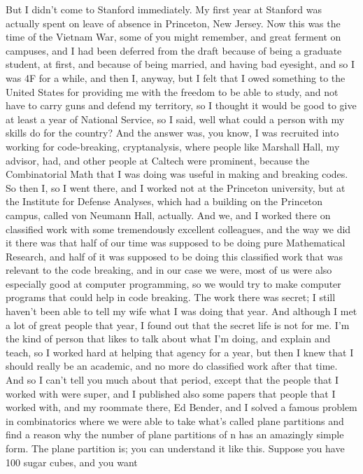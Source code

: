 \documentclass[]{article}
\begin{document}
But I didn't come to Stanford immediately. My first year at Stanford was
actually spent on leave of absence in Princeton, New Jersey. Now this
was the time of the Vietnam War, some of you might remember, and great
ferment on campuses, and I had been deferred from the draft because of
being a graduate student, at first, and because of being married, and
having bad eyesight, and so I was 4F for a while, and then I, anyway,
but I felt that I owed something to the United States for providing me
with the freedom to be able to study, and not have to carry guns and
defend my territory, so I thought it would be good to give at least a
year of National Service, so I said, well what could a person with my
skills do for the country? And the answer was, you know, I was recruited
into working for code-breaking, cryptanalysis, where people like
Marshall Hall, my advisor, had, and other people at Caltech were
prominent, because the Combinatorial Math that I was doing was useful in
making and breaking codes. So then I, so I went there, and I worked not
at the Princeton university, but at the Institute for Defense Analyses,
which had a building on the Princeton campus, called von Neumann Hall,
actually. And we, and I worked there on classified work with some
tremendously excellent colleagues, and the way we did it there was that
half of our time was supposed to be doing pure Mathematical Research,
and half of it was supposed to be doing this classified work that was
relevant to the code breaking, and in our case we were, most of us were
also especially good at computer programming, so we would try to make
computer programs that could help in code breaking. The work there was
secret; I still haven't been able to tell my wife what I was doing that
year. And although I met a lot of great people that year, I found out
that the secret life is not for me. I'm the kind of person that likes to
talk about what I'm doing, and explain and teach, so I worked hard at
helping that agency for a year, but then I knew that I should really be
an academic, and no more do classified work after that time. And so I
can't tell you much about that period, except that the people that I
worked with were super, and I published also some papers that people
that I worked with, and my roommate there, Ed Bender, and I solved a
famous problem in combinatorics where we were able to take what's called
plane partitions and find a reason why the number of plane partitions of
n has an amazingly simple form. The plane partition is; you can
understand it like this. Suppose you have 100 sugar cubes, and you want
\end{document}
